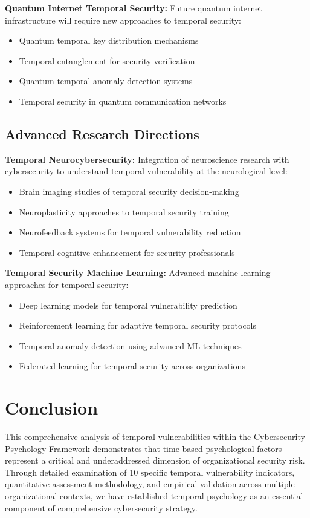 \documentclass[11pt,a4paper]{article}
\begin{document}
\textbf{Quantum Internet Temporal Security:} Future quantum internet infrastructure will require new approaches to temporal security:
\begin{itemize}
\item Quantum temporal key distribution mechanisms
\item Temporal entanglement for security verification
\item Quantum temporal anomaly detection systems
\item Temporal security in quantum communication networks
\end{itemize}

\subsection{Advanced Research Directions}

\textbf{Temporal Neurocybersecurity:} Integration of neuroscience research with cybersecurity to understand temporal vulnerability at the neurological level:
\begin{itemize}
\item Brain imaging studies of temporal security decision-making
\item Neuroplasticity approaches to temporal security training
\item Neurofeedback systems for temporal vulnerability reduction
\item Temporal cognitive enhancement for security professionals
\end{itemize}

\textbf{Temporal Security Machine Learning:} Advanced machine learning approaches for temporal security:
\begin{itemize}
\item Deep learning models for temporal vulnerability prediction
\item Reinforcement learning for adaptive temporal security protocols
\item Temporal anomaly detection using advanced ML techniques
\item Federated learning for temporal security across organizations
\end{itemize}

\section{Conclusion}

This comprehensive analysis of temporal vulnerabilities within the Cybersecurity Psychology Framework demonstrates that time-based psychological factors represent a critical and underaddressed dimension of organizational security risk. Through detailed examination of 10 specific temporal vulnerability indicators, quantitative assessment methodology, and empirical validation across multiple organizational contexts, we have established temporal psychology as an essential component of comprehensive cybersecurity strategy.
\end{document}
